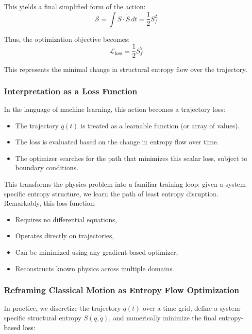 \documentclass[12pt]{article}
\begin{document}
This yields a final simplified form of the action:
\[
\mathcal{S} = \int S \cdot \dot{S} \, dt = \frac{1}{2} S_f^2
\]

Thus, the optimization objective becomes:
\[
\boxed{
\mathcal{L}_\text{loss} = \frac{1}{2} S_f^2
}
\]

This represents the minimal change in structural entropy flow over the trajectory.


\subsubsection{Interpretation as a Loss Function}

In the language of machine learning, this action becomes a trajectory loss:

\begin{itemize}
    \item The trajectory \(q(t)\) is treated as a learnable function (or array of values).
    \item The loss is evaluated based on the change in entropy flow over time.
    \item The optimizer searches for the path that minimizes this scalar loss, subject to boundary conditions.
\end{itemize}

This transforms the physics problem into a familiar training loop: given a system-specific entropy structure, we learn the path of least entropy disruption. Remarkably, this loss function:

\begin{itemize}
    \item Requires no differential equations,
    \item Operates directly on trajectories,
    \item Can be minimized using any gradient-based optimizer,
    \item Reconstructs known physics across multiple domains.
\end{itemize}


\subsubsection{Reframing Classical Motion as Entropy Flow Optimization}

In practice, we discretize the trajectory \(q(t)\) over a time grid, define a system-specific structural entropy \(S(q, \dot{q})\), and numerically minimize the final entropy-based loss:
\end{document}
